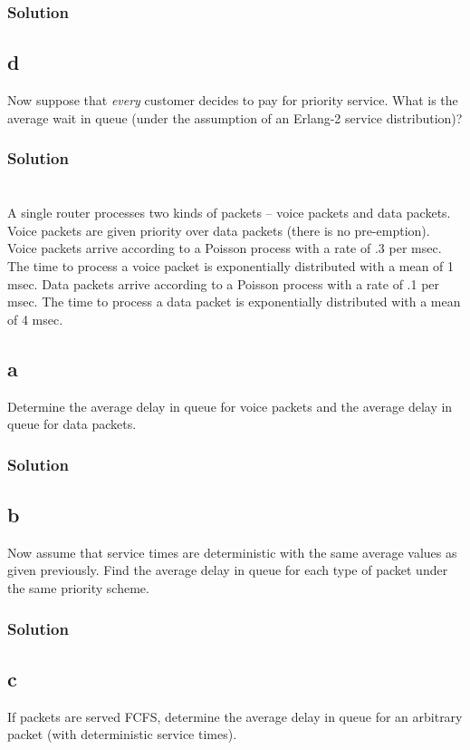 \documentclass[letterpaper]{amsart}
\begin{document}
\subsubsection*{Solution}

\subsection*{d}
Now suppose that \emph{every} customer decides to pay for priority service. What
is the average wait in queue (under the assumption of an Erlang-2 service
distribution)?
\subsubsection*{Solution}

\section{} %
A single router processes two kinds of packets – voice packets and data packets.
Voice packets are given priority over data packets (there is no pre-emption).
Voice packets arrive according to a Poisson process with a rate of .3 per msec.
The time to process a voice packet is exponentially distributed with a mean of 1
msec. Data packets arrive according to a Poisson process with a rate of .1 per
msec. The time to process a data packet is exponentially distributed with a mean
of 4 msec.
\subsection*{a}
Determine the average delay in queue for voice packets and the average
delay in queue for data packets.
\subsubsection*{Solution}
\subsection*{b}
Now assume that service times are deterministic with the same average
values as given previously. Find the average delay in queue for each type
of packet under the same priority scheme.
\subsubsection*{Solution}
\subsection*{c}
If packets are served FCFS, determine the average delay in queue for an
arbitrary packet (with deterministic service times).
\end{document}
